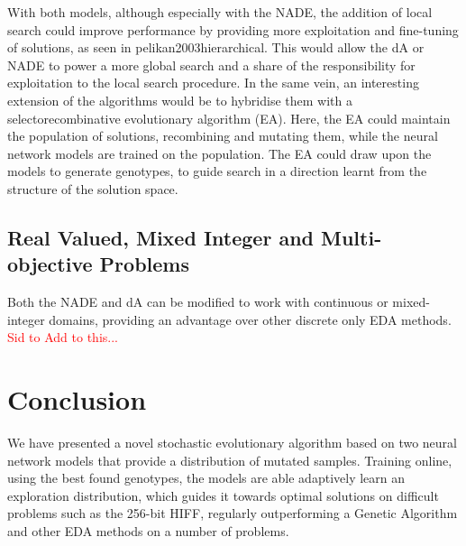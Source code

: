 \documentclass[twoside]{article}
\begin{document}
With both models, although especially with the NADE, the addition of local search could improve performance by providing more exploitation and fine-tuning of solutions, as seen in pelikan2003hierarchical. This would allow the dA or NADE to power a more global search and a share of the responsibility for exploitation to the local search procedure. In the same vein, an interesting extension of the algorithms would be to hybridise them with a selectorecombinative evolutionary algorithm (EA). Here, the EA could maintain the population of solutions, recombining and mutating them, while the neural network models are trained on the population. The EA could draw upon the models to generate genotypes, to guide search in a direction learnt from the structure of the solution space. 
\subsection{Real Valued, Mixed Integer and Multi-objective Problems}
Both the NADE and dA can be modified to work with continuous or mixed-integer domains, providing an advantage over other discrete only EDA methods. \textcolor{red}{Sid to Add to this...}

\section{Conclusion}
We have presented a novel stochastic evolutionary algorithm based on two neural network models that provide a distribution of mutated samples. Training online, using the best found genotypes, the models are able adaptively learn an exploration distribution, which guides it towards optimal solutions on difficult problems such as the 256-bit HIFF, regularly outperforming a Genetic Algorithm and other EDA methods on a number of problems.
\small



\end{document}
